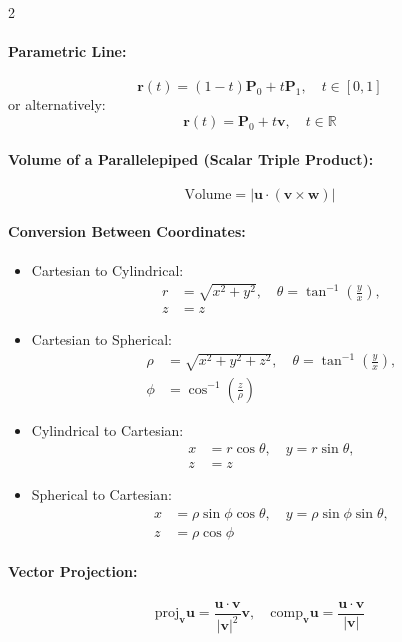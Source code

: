 \begin{multicols}{2}
\paragraph{Parametric Line:} 
\[
\mathbf{r}(t) = (1-t)\mathbf{P}_0 + t\mathbf{P}_1, \quad t \in [0,1]
\]
or alternatively:
\[
\mathbf{r}(t) = \mathbf{P}_0 + t\mathbf{v}, \quad t \in \mathbb{R}
\]

\paragraph{Volume of a Parallelepiped (Scalar Triple Product):}
\[
\text{Volume} = |\mathbf{u} \cdot (\mathbf{v} \times \mathbf{w})|
\]

\paragraph{Conversion Between Coordinates:}
\begin{itemize}
\item Cartesian to Cylindrical:
\[
\begin{aligned}
r &= \sqrt{x^2 + y^2}, \quad
\theta = \tan^{-1}\left(\frac{y}{x}\right), \\
z &= z
\end{aligned}
\]
\item Cartesian to Spherical:
\[
\begin{aligned}
\rho &= \sqrt{x^2 + y^2 + z^2}, \quad
\theta = \tan^{-1}\left(\frac{y}{x}\right), \\
\phi &= \cos^{-1}\left(\frac{z}{\rho}\right)
\end{aligned}
\]
\item Cylindrical to Cartesian:
\[
\begin{aligned}
x &= r \cos \theta, \quad
y = r \sin \theta, \\
z &= z
\end{aligned}
\]
\item Spherical to Cartesian:
\[
\begin{aligned}
x &= \rho \sin \phi \cos \theta, \quad
y = \rho \sin \phi \sin \theta, \\
z &= \rho \cos \phi
\end{aligned}
\]
\end{itemize}

\paragraph{Vector Projection:}
\[
\text{proj}_{\mathbf{v}}\mathbf{u} = \frac{\mathbf{u}\cdot\mathbf{v}}{|\mathbf{v}|^2}\mathbf{v}, \quad \text{comp}_{\mathbf{v}}\mathbf{u} = \frac{\mathbf{u}\cdot\mathbf{v}}{|\mathbf{v}|}
\]


\end{multicols}
